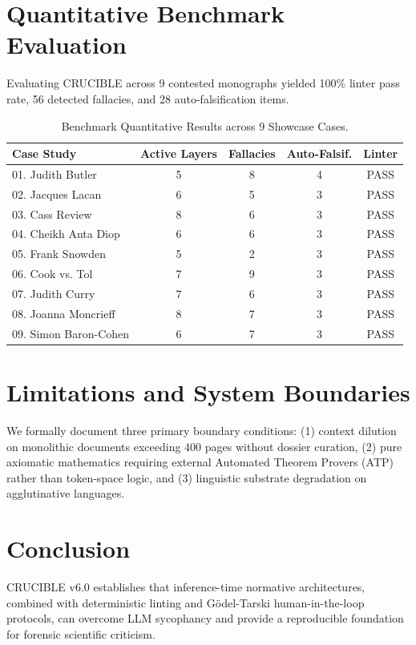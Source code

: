 \documentclass[11pt,a4paper]{article}
\begin{document}
\section{Quantitative Benchmark Evaluation}
Evaluating CRUCIBLE across 9 contested monographs yielded 100\% linter pass rate, 56 detected fallacies, and 28 auto-falsification items.

\begin{table}[h]
\centering
\small
\begin{tabular}{l c c c c}
\toprule
\textbf{Case Study} & \textbf{Active Layers} & \textbf{Fallacies} & \textbf{Auto-Falsif.} & \textbf{Linter} \\
\midrule
01. Judith Butler & 5 & 8 & 4 & PASS \\
02. Jacques Lacan & 6 & 5 & 3 & PASS \\
03. Cass Review & 8 & 6 & 3 & PASS \\
04. Cheikh Anta Diop & 6 & 6 & 3 & PASS \\
05. Frank Snowden & 5 & 2 & 3 & PASS \\
06. Cook vs. Tol & 7 & 9 & 3 & PASS \\
07. Judith Curry & 7 & 6 & 3 & PASS \\
08. Joanna Moncrieff & 8 & 7 & 3 & PASS \\
09. Simon Baron-Cohen & 6 & 7 & 3 & PASS \\
\bottomrule
\end{tabular}
\caption{Benchmark Quantitative Results across 9 Showcase Cases.}
\label{tab:benchmarks}
\end{table}

\section{Limitations and System Boundaries}
We formally document three primary boundary conditions: (1) context dilution on monolithic documents exceeding 400 pages without dossier curation, (2) pure axiomatic mathematics requiring external Automated Theorem Provers (ATP) rather than token-space logic, and (3) linguistic substrate degradation on agglutinative languages.

\section{Conclusion}
CRUCIBLE v6.0 establishes that inference-time normative architectures, combined with deterministic linting and G\"odel-Tarski human-in-the-loop protocols, can overcome LLM sycophancy and provide a reproducible foundation for forensic scientific criticism.
\end{document}
